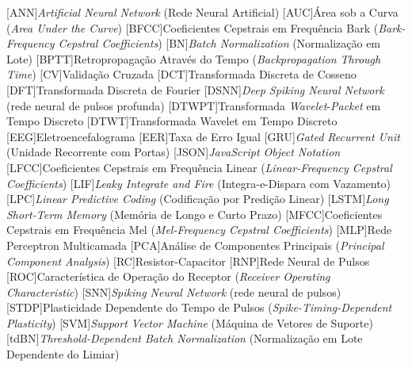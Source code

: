 \begin{acronym}[DTWPT]
	[ANN]{\textit{Artificial Neural Network} (Rede Neural Artificial)}
	[AUC]{Área sob a Curva (\textit{Area Under the Curve})}
	[BFCC]{Coeficientes Cepstrais em Frequência Bark (\textit{Bark-Frequency Cepstral Coefficients})}
	[BN]{\textit{Batch Normalization} (Normalização em Lote)}
	[BPTT]{Retropropagação Através do Tempo (\textit{Backpropagation Through Time})}
	[CV]{Validação Cruzada}
	[DCT]{Transformada Discreta de Cosseno}
	[DFT]{Transformada Discreta de Fourier}
	[DSNN]{\textit{Deep Spiking Neural Network} (rede neural de pulsos profunda)}
	[DTWPT]{Transformada \textit{Wavelet}-\textit{Packet} em Tempo Discreto}
	[DTWT]{Transformada Wavelet em Tempo Discreto}
	[EEG]{Eletroencefalograma}
	[EER]{Taxa de Erro Igual}
	[GRU]{\textit{Gated Recurrent Unit} (Unidade Recorrente com Portas)}
	[JSON]{\textit{JavaScript Object Notation}}
	[LFCC]{Coeficientes Cepstrais em Frequência Linear (\textit{Linear-Frequency Cepstral Coefficients})}
	[LIF]{\textit{Leaky Integrate and Fire} (Integra-e-Dispara com Vazamento)}
	[LPC]{\textit{Linear Predictive Coding} (Codificação por Predição Linear)}
	[LSTM]{\textit{Long Short-Term Memory} (Memória de Longo e Curto Prazo)}
	[MFCC]{Coeficientes Cepstrais em Frequência Mel (\textit{Mel-Frequency Cepstral Coefficients})}
	[MLP]{Rede Perceptron Multicamada}
	[PCA]{Análise de Componentes Principais (\textit{Principal Component Analysis})}
	[RC]{Resistor-Capacitor}
	[RNP]{Rede Neural de Pulsos}
	[ROC]{Característica de Operação do Receptor (\textit{Receiver Operating Characteristic})}
	[SNN]{\textit{Spiking Neural Network} (rede neural de pulsos)}
	[STDP]{Plasticidade Dependente do Tempo de Pulsos (\textit{Spike-Timing-Dependent Plasticity})}
	[SVM]{\textit{Support Vector Machine} (Máquina de Vetores de Suporte)}
	[tdBN]{\textit{Threshold-Dependent Batch Normalization} (Normalização em Lote Dependente do Limiar)}
\end{acronym}

\cleardoublepage
